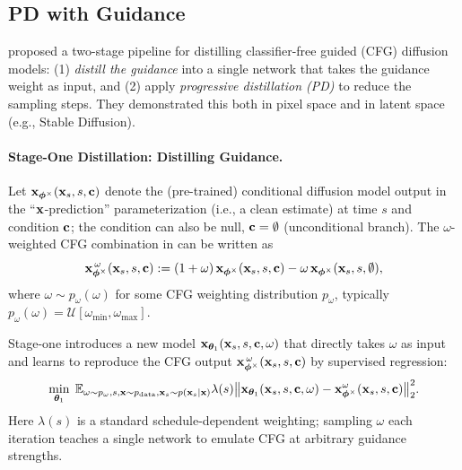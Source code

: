 


\subsection{PD with Guidance}\label{subsec:pd-guidance}
\citet{meng2023distillation} proposed a two-stage pipeline for distilling
classifier-free guided (CFG) diffusion models: (1) \emph{distill the guidance}
into a single network that takes the guidance weight as input, and (2) apply
\emph{progressive distillation (PD)} to reduce the sampling steps. They
demonstrated this both in pixel space and in latent space (e.g., Stable Diffusion).

\paragraph{Stage-One Distillation: Distilling Guidance.}
Let ${\mathbf{x}}_{\bm{\phi}^\times}({\mathbf{x}}_s, s, {\mathbf{c}})$ denote the (pre-trained) conditional
diffusion model output in the ``${\mathbf{x}}$-prediction'' parameterization (i.e., a
clean estimate) at time $s$ and condition ${\mathbf{c}}$; the condition can also
be null, ${\mathbf{c}}=\emptyset$ (unconditional branch). The $\omega$-weighted CFG
combination in  can be written as
\begin{equation}\label{eq:cfg-model-clean}
   {\mathbf{x}}_{\bm{\phi}^\times}^{\,\omega}({\mathbf{x}}_s, s, {\mathbf{c}})
   := (1+\omega)\,{\mathbf{x}}_{\bm{\phi}^\times}({\mathbf{x}}_s, s, {\mathbf{c}})
      - \omega\,{\mathbf{x}}_{\bm{\phi}^\times}({\mathbf{x}}_s, s, \emptyset),
\end{equation}
where $\omega \sim p_\omega(\omega)$ for some CFG weighting distribution $p_\omega$, typically $p_\omega(\omega)=\mathcal{U}[\omega_{\min},\omega_{\max}]$.

Stage-one introduces a new model ${\mathbf{x}}_{\bm{\theta}_1}({\mathbf{x}}_s, s, {\mathbf{c}}, \omega)$
that directly takes $\omega$ as input and learns to reproduce the CFG
output ${\mathbf{x}}_{\bm{\phi}^\times}^{\,\omega}({\mathbf{x}}_s, s, {\mathbf{c}})$ by supervised
regression:
\[
\min_{\bm{\theta}_1}\;
\mathbb{E}_{\omega\sim p_\omega, s, {\mathbf{x}}\sim p_{\mathrm{data}}, {\mathbf{x}}_s \sim p({\mathbf{x}}_s\mid {\mathbf{x}})}
\lambda(s)
\big\|{\mathbf{x}}_{\bm{\theta}_1}({\mathbf{x}}_s, s, {\mathbf{c}}, \omega)-{\mathbf{x}}_{\bm{\phi}^\times}^{\omega}({\mathbf{x}}_s, s, {\mathbf{c}})\big\|_2^2.
\]
Here $\lambda(s)$ is a standard schedule-dependent weighting; sampling $\omega$
each iteration teaches a single network to emulate CFG at arbitrary
guidance strengths.

